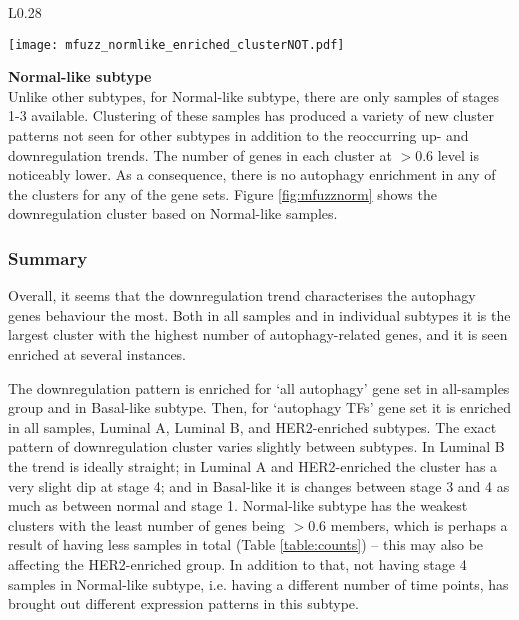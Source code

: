         
        \begin{wrapfigure}{L}{0.28\textwidth}
        \hfill
        \captionsetup{justification=centering}
        \centerline{ \texttt{[image: mfuzz\_normlike\_enriched\_clusterNOT.pdf]}}
        \vspace*{-8mm}
        \caption[Normal-like subtype downregulation cluster]{\label{fig:mfuzznorm}Normal-like\newline downregulation cluster}
        \end{wrapfigure}
      
        \textbf{Normal-like subtype}\\ 
        Unlike other subtypes, for Normal-like subtype, there are only samples of stages 1-3 available. Clustering of these samples has produced a variety of new cluster patterns not seen for other subtypes in addition to the reoccurring up- and downregulation trends. The number of genes in each cluster at $>0.6$ level is noticeably lower.  As a consequence, there is no autophagy enrichment in any of the clusters for any of the gene sets. Figure \ref{fig:mfuzznorm} shows the downregulation cluster based on Normal-like samples. 
        \newline
        \newline
        \newline
        

    \subsubsection{Summary}
    
    Overall, it seems that the downregulation trend characterises the autophagy genes behaviour the most. Both in all samples and in individual subtypes it is the largest cluster with the highest number of autophagy-related genes, and it is seen enriched at several instances. 
    
    The downregulation pattern is enriched for ‘all autophagy' gene set in all-samples group and in Basal-like subtype. Then, for ‘autophagy TFs' gene set it is enriched in all samples, Luminal A, Luminal B, and HER2-enriched subtypes. The exact pattern of downregulation cluster varies slightly between subtypes. In Luminal B the trend is ideally straight; in Luminal A and HER2-enriched the cluster has a very slight dip at stage 4; and in Basal-like it is changes between stage 3 and 4 as much as between normal and stage 1. Normal-like subtype has the weakest clusters with the least number of genes being $>0.6$ members, which is perhaps a result of having less samples in total (Table \ref{table:counts}) -- this may also be affecting the HER2-enriched group. In addition to that, not having stage 4 samples in Normal-like subtype, i.e. having a different number of time points, has brought out different expression patterns in this subtype. 
    
